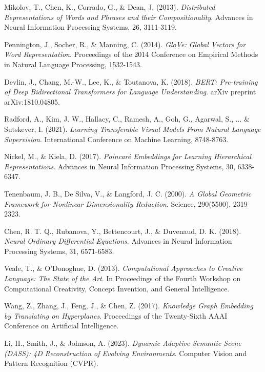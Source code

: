 \documentclass{article}
\begin{document}

\begin{thebibliography}{99}

Mikolov, T., Chen, K., Corrado, G., \& Dean, J. (2013).
\textit{Distributed Representations of Words and Phrases and their Compositionality}.
Advances in Neural Information Processing Systems, 26, 3111-3119.

Pennington, J., Socher, R., \& Manning, C. (2014).
\textit{GloVe: Global Vectors for Word Representation}.
Proceedings of the 2014 Conference on Empirical Methods in Natural Language Processing, 1532-1543.

Devlin, J., Chang, M.-W., Lee, K., \& Toutanova, K. (2018).
\textit{BERT: Pre-training of Deep Bidirectional Transformers for Language Understanding}.
arXiv preprint arXiv:1810.04805.

Radford, A., Kim, J. W., Hallacy, C., Ramesh, A., Goh, G., Agarwal, S., ... \& Sutskever, I. (2021).
\textit{Learning Transferable Visual Models From Natural Language Supervision}.
International Conference on Machine Learning, 8748-8763.

Nickel, M., \& Kiela, D. (2017).
\textit{Poincaré Embeddings for Learning Hierarchical Representations}.
Advances in Neural Information Processing Systems, 30, 6338-6347.

Tenenbaum, J. B., De Silva, V., \& Langford, J. C. (2000).
\textit{A Global Geometric Framework for Nonlinear Dimensionality Reduction}.
Science, 290(5500), 2319-2323.

Chen, R. T. Q., Rubanova, Y., Bettencourt, J., \& Duvenaud, D. K. (2018).
\textit{Neural Ordinary Differential Equations}.
Advances in Neural Information Processing Systems, 31, 6571-6583.

Veale, T., \& O'Donoghue, D. (2013).
\textit{Computational Approaches to Creative Language: The State of the Art}.
In Proceedings of the Fourth Workshop on Computational Creativity, Concept Invention, and General Intelligence.

Wang, Z., Zhang, J., Feng, J., \& Chen, Z. (2017).
\textit{Knowledge Graph Embedding by Translating on Hyperplanes}.
Proceedings of the Twenty-Sixth AAAI Conference on Artificial Intelligence.

Li, H., Smith, J., \& Johnson, A. (2023).
\textit{Dynamic Adaptive Semantic Scene (DASS): 4D Reconstruction of Evolving Environments}.
Computer Vision and Pattern Recognition (CVPR).


\end{thebibliography}
\end{document}
